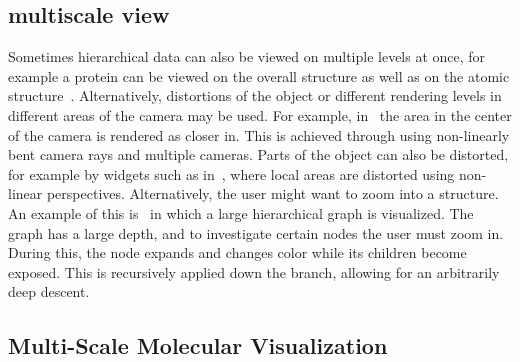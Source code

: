 \documentclass[review,journal]{vgtc}         %
\begin{document}
%
%


\subsection{multiscale view}
Sometimes hierarchical data can also be viewed on multiple levels at once, for example a protein can be viewed on the overall structure as well as on the atomic structure~\cite{OrderIndependent}. 
Alternatively, distortions of the object or different rendering levels in different areas of the camera may be used. 
For example, in~\cite{MultiscaleViews} the area in the center of the camera is rendered as closer in. 
This is achieved through using non-linearly bent camera rays and multiple cameras. Parts of the object can also be distorted, for example by widgets such as in~\cite{PerspectiveWidgets}, where local areas are distorted using non-linear perspectives. Alternatively, the user might want to zoom into a structure. An example of this is~\cite{LexicalNetworks} in which a large hierarchical graph is visualized. The graph has a large depth, and to investigate certain nodes the user must zoom in. During this, the node expands and changes color while its children become exposed. This is recursively applied down the branch, allowing for an arbitrarily deep descent.


\subsection{Multi-Scale Molecular Visualization}
\end{document}

